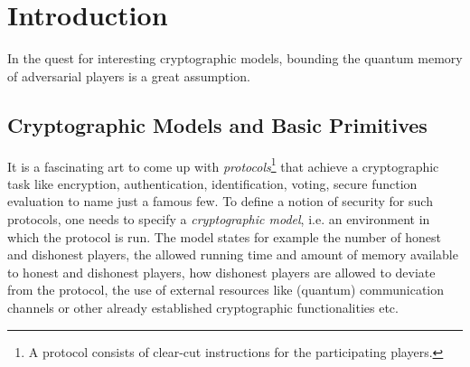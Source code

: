 \clearemptydoublepage
\chapter{Introduction} \label{chap:intro}

In the quest for interesting cryptographic
models, bounding the quantum memory of adversarial players is a great
assumption.

\section{Cryptographic Models and Basic Primitives} \label{sec:cryptomodels}
It is a fascinating art to come up with
\emph{protocols}\footnote{A protocol consists of
  clear-cut instructions for the participating players.} that achieve a
cryptographic task like encryption, authentication, identification,
voting, secure function evaluation to name just a famous few. To
define a notion of security for such protocols, one needs to specify a
\emph{cryptographic model}, i.e. an
environment in which the protocol is run. The model states for example
the number of honest and dishonest players, the allowed running time
and amount of memory available to honest and dishonest players, how
dishonest players are allowed to deviate from the protocol, the use of
external resources like (quantum) communication channels or other
already established cryptographic functionalities etc.

